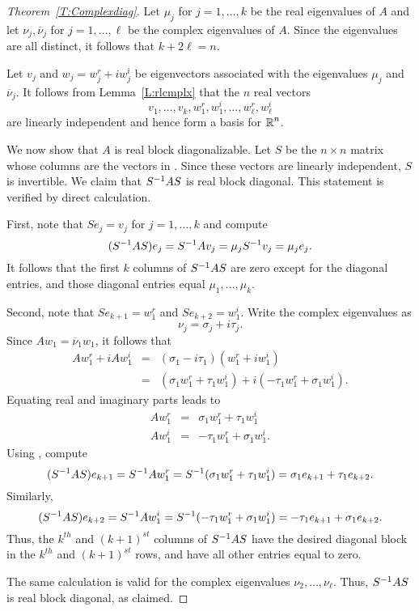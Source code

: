 \documentclass{ximera}
\begin{document}
\begin{proof}[Theorem~\ref{T:Complexdiag}]   Let $\mu_j$ for 
$j=1,\ldots,k$ be the real eigenvalues of $A$ and let 
$\nu_j,\overline{\nu}_j$ for $j=1,\ldots,\ell$ be the complex eigenvalues of 
$A$. Since the eigenvalues are all distinct, it follows that $k+2\ell=n$.

Let $v_j$ and $w_j=w_j^r+iw_j^i$ be eigenvectors associated with the 
eigenvalues $\mu_j$ and $\overline{\nu}_j$.  It follows from 
Lemma~\ref{L:rlcmplx} that the $n$ real vectors
\begin{equation}  \label{e:complexeigen}
v_1,\ldots,v_k,w_1^r,w_1^i,\ldots,w_\ell^r,w_\ell^i
\end{equation}
are linearly independent and hence form a basis for $\mbox{$\Bbb{R}$}^n$.

We now show that $A$ is real block diagonalizable.  Let $S$ be the $n\times
n$ matrix whose columns are the vectors in .  Since
these vectors are linearly independent, $S$ is invertible.  We claim that 
$S^{-1} AS$ is real block diagonal.  This statement is verified by direct
calculation.

First, note that $Se_j=v_j$ for $j=1,\ldots,k$ and compute
\[
(S^{-1} AS)e_j = S^{-1} Av_j = \mu_j S^{-1} v_j = \mu_j e_j.
\]
It follows that the first $k$ columns of $S^{-1} AS$ are zero except for the 
diagonal entries, and those diagonal entries equal $\mu_1,\ldots,\mu_k$.

Second, note that $Se_{k+1}=w_1^r$ and $Se_{k+2}=w_1^i$.  Write the complex 
eigenvalues as
\[
\nu_j = \sigma_j+i\tau_j.
\]
Since 
$Aw_1 = \overline{\nu}_1w_1$, it follows that
\begin{eqnarray*}
Aw_1^r+iAw_1^i & = & (\sigma_1-i\tau_1)(w_1^r+iw_1^i)\\
& = & (\sigma_1w_1^r+\tau_1w_1^i) + i(-\tau_1w_1^r +\sigma_1w_1^i).
\end{eqnarray*}
Equating real and imaginary parts leads to 
\begin{equation}  \label{e:complexsimple}
\begin{array}{ccc} Aw_1^r & = & \sigma_1w_1^r+\tau_1w_1^i\\
Aw_1^i & = &   -\tau_1w_1^r+\sigma_1w_1^i. \end{array}
\end{equation}
Using , compute
\[
(S^{-1} AS)e_{k+1} = S^{-1} Aw_1^r = S^{-1}(\sigma_1w_1^r+\tau_1w_1^i) 
= \sigma_1e_{k+1} + \tau_1e_{k+2}.
\]
Similarly, 
\[
(S^{-1} AS)e_{k+2} = S^{-1} Aw_1^i = S^{-1}(-\tau_1w_1^r+\sigma_1w_1^i)
= -\tau_1e_{k+1} + \sigma_1e_{k+2}.
\]
Thus, the $k^{th}$ and $(k+1)^{st}$ columns of $S^{-1} AS$ have the desired
diagonal block in the $k^{th}$ and $(k+1)^{st}$ rows, and have all other 
entries equal to zero.

The same calculation is valid for the complex eigenvalues 
$\nu_2,\ldots,\nu_\ell$.  Thus, $S^{-1} AS$ is real block diagonal, as 
claimed.   \end{proof}
\end{document}
